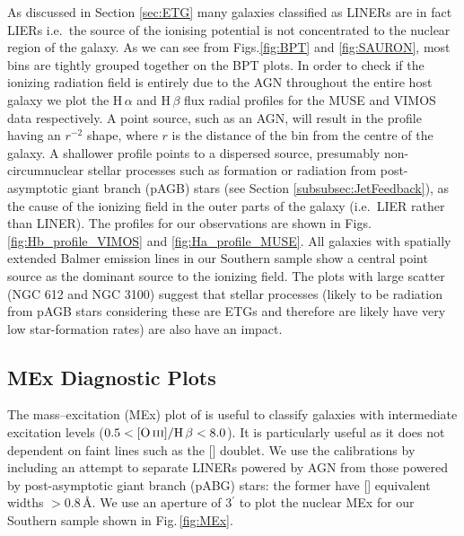 		As discussed in Section \ref{sec:ETG} many galaxies classified as LINERs are in fact LIERs \citep[e.g.][]{Sarzi2005, Sarzi2010, Singh2013, Belfiore2016} i.e.\ the source of the ionising potential is not concentrated to the nuclear region of the galaxy. As we can see from Figs.\ref{fig:BPT} and \ref{fig:SAURON}, most bins are tightly grouped together on the BPT plots. In order to check if the ionizing radiation field is entirely due to the AGN throughout the entire host galaxy we plot the H\,$\alpha$ and H\,$\beta$ flux radial profiles for the MUSE and VIMOS data respectively. A point source, such as an AGN, will result in the profile having an $r^{-2}$ shape, where $r$ is the distance of the bin from the centre of the galaxy. A shallower profile points to a dispersed source, presumably non-circumnuclear stellar processes such as formation or radiation from post-asymptotic giant branch (pAGB) stars (see Section \ref{subsubsec:JetFeedback}), as the cause of the ionizing field in the outer parts of the galaxy (i.e.\ LIER rather than LINER). The profiles for our observations are shown in Figs.\,\ref{fig:Hb_profile_VIMOS} and \ref{fig:Ha_profile_MUSE}. All galaxies with spatially extended Balmer emission lines in our Southern sample show a central point source as the dominant source to the ionizing field. The plots with large scatter (NGC 612 and NGC 3100) suggest that stellar processes (likely to be radiation from pAGB stars considering these are ETGs and therefore are likely have very low star-formation rates) are also have an impact.

		


	\subsection{MEx Diagnostic Plots}
		\label{subsec:MEx}
		The mass--excitation (MEx) plot of \citet{Juneau2011} is useful to classify galaxies with intermediate excitation levels ($0.5 < \mathrm{[\ion{O}{iii}]/H\,\beta} < 8.0$). It is particularly useful as it does not dependent on faint lines such as the [] doublet. We use the calibrations by \citet{Nyland2016} including an attempt to separate LINERs powered by AGN from those powered by post-asymptotic giant branch (pABG) stars: the former have [] equivalent widths $>0.8$\,\AA. We use an aperture of 3$^\prime$ to plot the nuclear MEx for our Southern sample shown in Fig.\,\ref{fig:MEx}. 


